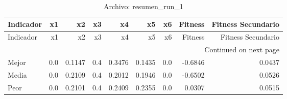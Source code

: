 \begin{longtable}{lrrrrrrrr}
\caption{Archivo: resumen\_run\_1}\label{tab:resumen_run_1} \\
\toprule
Indicador & x1 & x2 & x3 & x4 & x5 & x6 & Fitness & Fitness Secundario \\
\midrule
\endfirsthead
\toprule
Indicador & x1 & x2 & x3 & x4 & x5 & x6 & Fitness & Fitness Secundario \\
\midrule
\endhead
\midrule
\multicolumn{9}{r}{Continued on next page} \\
\midrule
\endfoot
\bottomrule
\endlastfoot
Mejor & 0.0 & 0.1147 & 0.4 & 0.3476 & 0.1435 & 0.0 & -0.6846 & 0.0437 \\
Media & 0.0 & 0.2109 & 0.4 & 0.2012 & 0.1946 & 0.0 & -0.6502 & 0.0526 \\
Peor & 0.0 & 0.2101 & 0.4 & 0.2409 & 0.2355 & 0.0 & 0.0307 & 0.0515 \\
\end{longtable}